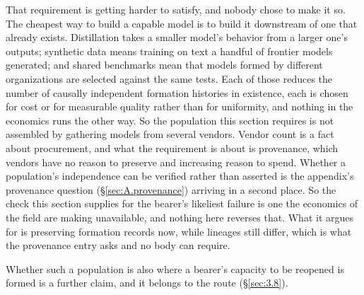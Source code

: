 That requirement is getting harder to satisfy, and nobody chose to make it so. The cheapest way to build a capable model is to build it downstream of one that already exists. Distillation takes a smaller model's behavior from a larger one's outputs; synthetic data means training on text a handful of frontier models generated; and shared benchmarks mean that models formed by different organizations are selected against the same tests. Each of those reduces the number of causally independent formation histories in existence, each is chosen for cost or for measurable quality rather than for uniformity, and nothing in the economics runs the other way. So the population this section requires is not assembled by gathering models from several vendors. Vendor count is a fact about procurement, and what the requirement is about is provenance, which vendors have no reason to preserve and increasing reason to spend. Whether a population's independence can be verified rather than asserted is the appendix's provenance question (§\ref{sec:A.provenance}) arriving in a second place. So the check this section supplies for the bearer's likeliest failure is one the economics of the field are making unavailable, and nothing here reverses that. What it argues for is preserving formation records now, while lineages still differ, which is what the provenance entry asks and no body can require.

Whether such a population is also where a bearer's capacity to be
reopened is formed is a further claim, and it belongs to the route
(§\ref{sec:3.8}).
